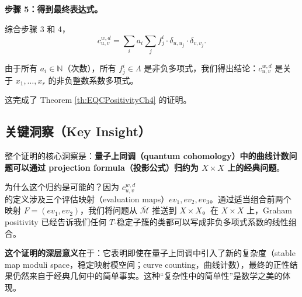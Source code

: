 \textbf{步骤 5：得到最终表达式。}

综合步骤 3 和 4，
$$c_{u,v}^{w,d} = \sum_i a_i \sum_j f_j^i \cdot \delta_{u,u_j} \cdot \delta_{v,v_j}.$$

由于所有 $a_i \in \mathbb{N}$（次数），所有 $f_j^i \in \Lambda$ 是非负多项式，我们得出结论：$c_{u,v}^{w,d}$ 是关于 $x_1, \ldots, x_r$ 的非负整数系数多项式。

这完成了 Theorem \cref{th:EQCPositivityCh4} 的证明。

\subsection{关键洞察（Key Insight）}

整个证明的核心洞察是：\textbf{量子上同调（quantum cohomology）中的曲线计数问题可以通过 projection formula（投影公式）归约为 $X \times X$ 上的经典问题}。

为什么这个归约是可能的？因为 $c_{u,v}^{w,d}$ 的定义涉及三个评估映射（evaluation maps）$ev_1, ev_2, ev_3$。通过适当组合前两个映射 $F = (ev_1, ev_2)$，我们将问题从 $\overline{\mathcal{M}}$ 推送到 $X \times X$。在 $X \times X$ 上，Graham positivity 已经告诉我们任何 $T$-稳定子簇的类都可以写成非负多项式系数的线性组合。

\textbf{这个证明的深层意义}在于：它表明即使在量子上同调中引入了新的复杂度（stable map moduli space，稳定映射模空间；curve counting，曲线计数），最终的正性结果仍然来自于经典几何中的简单事实。这种``复杂性中的简单性''是数学之美的体现。

\endinput
